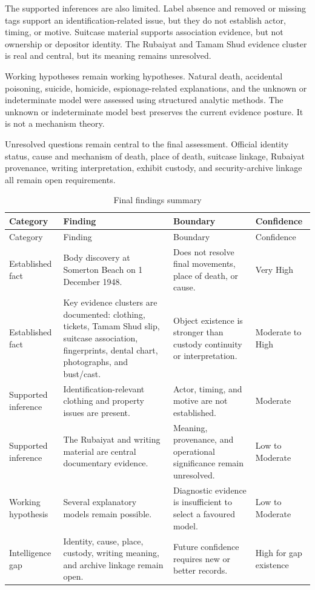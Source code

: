 The supported inferences are also limited. Label absence and removed or missing tags support an identification-related issue, but they do not establish actor, timing, or motive. Suitcase material supports association evidence, but not ownership or depositor identity. The Rubaiyat and Tamam Shud evidence cluster is real and central, but its meaning remains unresolved.

Working hypotheses remain working hypotheses. Natural death, accidental poisoning, suicide, homicide, espionage-related explanations, and the unknown or indeterminate model were assessed using structured analytic methods. The unknown or indeterminate model best preserves the current evidence posture. It is not a mechanism theory.

Unresolved questions remain central to the final assessment. Official identity status, cause and mechanism of death, place of death, suitcase linkage, Rubaiyat provenance, writing interpretation, exhibit custody, and security-archive linkage all remain open requirements.

\begingroup
\scriptsize
\setlength{\tabcolsep}{2pt}
\renewcommand{\arraystretch}{1.12}
\begin{longtable}{>{\raggedright\arraybackslash}p{}>{\raggedright\arraybackslash}p{}>{\raggedright\arraybackslash}p{}>{\raggedright\arraybackslash}p{}}
\caption{Final findings summary}\label{tab:chapter12-final-findings}\\
\toprule
Category & Finding & Boundary & Confidence \\
\midrule
\endfirsthead
\toprule
Category & Finding & Boundary & Confidence \\
\midrule
\endhead
Established fact & Body discovery at Somerton Beach on 1 December 1948. & Does not resolve final movements, place of death, or cause. & Very High \\
Established fact & Key evidence clusters are documented: clothing, tickets, Tamam Shud slip, suitcase association, fingerprints, dental chart, photographs, and bust/cast. & Object existence is stronger than custody continuity or interpretation. & Moderate to High \\
Supported inference & Identification-relevant clothing and property issues are present. & Actor, timing, and motive are not established. & Moderate \\
Supported inference & The Rubaiyat and writing material are central documentary evidence. & Meaning, provenance, and operational significance remain unresolved. & Low to Moderate \\
Working hypothesis & Several explanatory models remain possible. & Diagnostic evidence is insufficient to select a favoured model. & Low to Moderate \\
Intelligence gap & Identity, cause, place, custody, writing meaning, and archive linkage remain open. & Future confidence requires new or better records. & High for gap existence \\
\bottomrule
\end{longtable}
\endgroup

